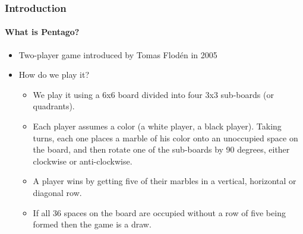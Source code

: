 \documentclass[10pt]{beamer}
\begin{document}
\begin{frame}
\frametitle{Introduction}
\framesubtitle{What is Pentago?}

	\begin{itemize}
	  
		\item Two-player game introduced by Tomas Flodén in 2005
		\item How do we play it?
			\begin{itemize}
			  
			  \item We play it using a 6x6 board divided into four 3x3 sub-boards (or
			  quadrants).

			  \item Each player assumes a color (a white player, a black player). 
			  Taking turns, each one places a marble of his color onto an unoccupied
			  space on the board, and then rotate one of the sub-boards by 90 degrees,
			  either clockwise or anti-clockwise.

			  \item A player wins by getting five of their marbles in a vertical,
			  horizontal or diagonal row.

			  \item If all 36 spaces on the board are occupied without a row of five
			  being formed then the game is a draw.
			  
			\end{itemize}

	\end{itemize}
\end{frame}
\end{document}
